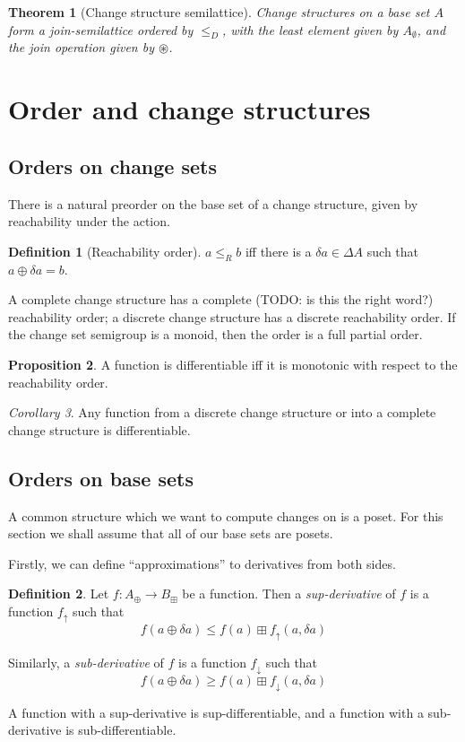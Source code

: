 \documentclass[english]{article}
\theoremstyle{plain}
\newtheorem{thm}{Theorem}
\theoremstyle{definition}
\newtheorem{prop}[thm]{Proposition}
\theoremstyle{remark}
\theoremstyle{remark}
\newtheorem{corollary}[thm]{Corollary}
\theoremstyle{remark}
\theoremstyle{definition}
\newtheorem{defn}{Definition}
\newcommand{\cplus}{\oplus}
\newcommand{\cpluss}{\boxplus}
\newcommand{\changes}[1]{\Delta #1}
\newcommand{\change}[1]{\delta #1}
\newcommand{\discrete}{\emptyset}
\newcommand{\supderive}[1]{#1_\uparrow}
\newcommand{\subderive}[1]{#1_\downarrow}
\newcommand{\superpose}{\circledast}
\newcommand{\reachOrder}{\leq_R}
\newcommand{\fineOrder}{\leq_D}
\begin{document}
\begin{thm}[Change structure semilattice]
  Change structures on a base set $A$ form a join-semilattice 
  ordered by $\fineOrder$, with the least element given by
  $A_\discrete$, and the join operation given by $\superpose$.
\end{thm}

\section{Order and change structures}

\subsection{Orders on change sets}

There is a natural preorder on the base set of a change structure, given by reachability under the action.

\begin{defn}[Reachability order]
  $a \reachOrder b$ iff there is a $\change{a} \in \changes{A}$ such that $a \cplus
  \change{a} = b$.
\end{defn}

A complete change structure has a complete (TODO: is this the right word?) reachability order;
a discrete change structure has a discrete reachability order. If the change set
semigroup is a monoid, then the order is a full partial order.

\begin{prop}
  A function is differentiable iff it is monotonic with respect to the
  reachability order.
\end{prop}

\begin{corollary}
  Any function from a discrete change structure or into a complete change
  structure is differentiable.
\end{corollary}

\subsection{Orders on base sets}

A common structure which we want to compute changes on is a poset. For this
section we shall assume that all of our base sets are posets.

Firstly, we can define ``approximations'' to derivatives from both sides.

\begin{defn}
  Let $f: A_\cplus \rightarrow B_\cpluss$ be a function. Then a \textit{sup-derivative}
  of $f$ is a function $\supderive{f}$ such that
  $$f(a \cplus \change{a}) \leq f(a) \cpluss \supderive{f}(a, \change{a})$$
  
  Similarly, a \textit{sub-derivative} of $f$ is a function $\subderive{f}$ such that 
  $$f(a \cplus \change{a}) \geq f(a) \cpluss \subderive{f}(a, \change{a})$$

  A function with a sup-derivative is sup-differentiable, and a function with a
  sub-derivative is sub-differentiable.
\end{defn}
\end{document}
